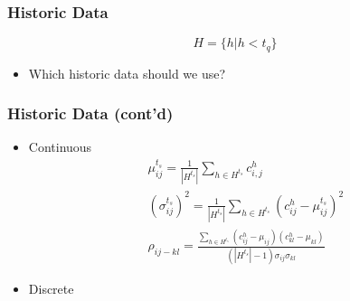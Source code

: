 \documentclass[t]{beamer}
\begin{document}
\begin{frame}\frametitle{Historic Data}
\begin{equation*}
H = \{h | h < t_q\}
\end{equation*}

\begin{itemize}
\item<2-> Which historic data should we use?
\end{itemize}
\vspace{0.25in}
\end{frame}

\begin{frame}\frametitle{Historic Data \small{(cont'd)}}
\begin{itemize}
\item Continuous
\begin{gather*}
	\mu_{ij}^{t_s} = \frac{1}{|H^{t_s}|}\sum_{h\in H^{t_s}} c_{i,j}^h\\ 
	(\sigma_{ij}^{t_s})^2 = \frac{1}{|H^{t_s}|}\sum_{h\in H^{t_s}} (c_{ij}^h-\mu_{ij}^{t_s})^2\\
	\rho_{ij-kl} = \frac{\sum_{h\in H^{t_s}} (c_{ij}^h - \mu_{ij}) (c_{kl}^h -
	\mu_{kl})}{(|H^{t_s}|-1) \sigma_{ij} \sigma_{kl}}
\end{gather*}
\item<2-> Discrete
\end{itemize}
\end{frame}
\end{document}
